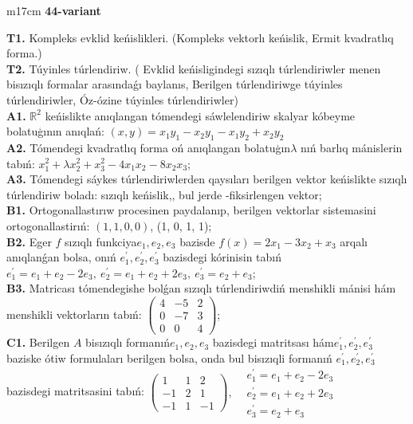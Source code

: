 \documentclass{article}
\begin{document}
\begin{tabular}{m{17cm}}
\textbf{44-variant}
\newline

\textbf{T1.} Kompleks evklid keńislikleri.  (Kompleks vektorlı keńislik, Ermit kvadratlıq forma.) \\
\textbf{T2.} Túyinles túrlendiriw. ( Evklid keńisligindegi sızıqlı túrlendiriwler menen bisızıqlı formalar arasındaǵı baylanıs, Berilgen túrlendiriwge túyinles túrlendiriwler, Óz-ózine túyinles túrlendiriwler) \\
\textbf{A1.} \(\mathbb{R}^{2}\) keńislikte anıqlangan tómendegi sáwlelendiriw skalyar kóbeyme bolatuģının anıqlań: \((x,y) = x_{1}y_{1} - x_{2}y_{1} - x_{1}y_{2} + x_{2}y_{2}\) \\
\textbf{A2.} Tómendegi kvadratlıq forma oń anıqlangan bolatuģın\(\lambda\) nıń barlıq mánislerin tabıń: \(x_{1}^{2} + \lambda x_{2}^{2} + x_{3}^{2} - 4x_{1}x_{2} - 8x_{2}x_{3}\); \\
\textbf{A3.} Tómendegi sáykes túrlendiriwlerden qaysıları berilgen vektor keńislikte sızıqlı túrlendiriw boladı: sızıqlı keńislik,, bul jerde -fiksirlengen vektor; \\
\textbf{B1.} Ortogonallastırıw procesinen paydalanıp, berilgen vektorlar sistemasini ortogonallastirıń: \((1,1,0,0)\), (1, 0, 1, 1); \\
\textbf{B2.} Eger \(f\) sızıqlı funkciya\(e_{1},e_{2},e_{3}\) bazisde \(f(x) = 2x_{1} - 3x_{2} + x_{3}\) arqalı anıqlanǵan bolsa, onıń \(e_{1}^{'},e_{2}^{'},e_{3}^{'}\) bazisdegi kórinisin tabıń\(e_{1}^{'} = e_{1} + e_{2} - 2e_{3},\ e_{2}^{'} = e_{1} + e_{2} + 2e_{3},\ e_{3}^{'} = e_{2} + e_{3}\); \\
\textbf{B3.} Matricası tómendegishe bolǵan sızıqlı túrlendiriwdiń menshikli mánisi hám menshikli vektorların tabıń: \(\begin{pmatrix} 4 & - 5 & 2 \\ 0 & - 7 & 3 \\ 0 & 0 & 4 \end{pmatrix}\); \\
\textbf{C1.} Berilgen \(A\) bisızıqlı formanıń\(e_{1},e_{2},e_{3}\) bazisdegi matritsası hám\(e_{1}^{'},e_{2}^{'},e_{3}^{'}\) baziske ótiw formulaları berilgen bolsa, onda bul bisızıqli formanıń \(e_{1}^{'},e_{2}^{'},e_{3}^{'}\) bazisdegi matritsasini tabıń: \(\begin{pmatrix} 1 & 1 & 2 \\  - 1 & 2 & 1 \\  - 1 & 1 & - 1 \end{pmatrix},\begin{matrix}  & e_{1}^{'} = e_{1} + e_{2} - 2e_{3} \\  & e_{2}^{'} = e_{1} + e_{2} + 2e_{3} \\  & e_{3}^{'} = e_{2} + e_{3} \end{matrix}\) \\

\end{tabular}
\end{document}

